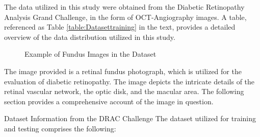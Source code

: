 The data utilized in this study were obtained from the Diabetic Retinopathy Analysis Grand Challenge, in the form of OCT-Angiography images.
A table, referenced as Table \ref{table:Datasettraining} in the text, provides a detailed overview of the data distribution utilized in this study.
\begin{figure}[hbtp]
	\centering
	\caption{Example of Fundus Images in the Dataset}
	\label{fig:sampleDataset}
\end{figure}

The image provided is a retinal fundus photograph, which is utilized for the evaluation of diabetic retinopathy. The image depicts the intricate details of the retinal vascular network, the optic disk, and the macular area. The following section provides a comprehensive account of the image in question.

Dataset Information from the DRAC Challenge
The dataset utilized for training and testing comprises the following:

